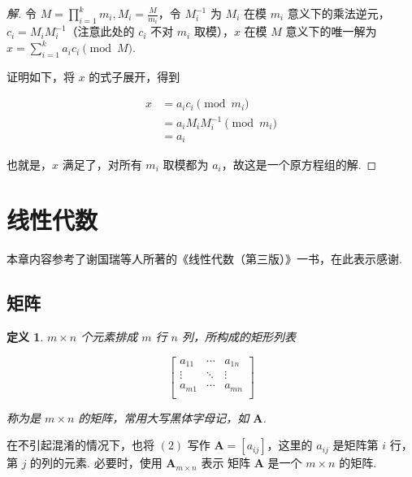 \documentclass[a4paper]{article}
\newtheorem{definition}{定义}[section]
\begin{document}
\begin{proof}[解]
    令 $M=\prod\limits_{i=1}^k m_i,M_i=\frac{M}{m_i}$，令 $M_i^{-1}$ 为
    $M_i$ 在模 $m_i$ 意义下的乘法逆元，$c_i=M_iM_i^{-1}$（注意此处的 $c_i$ 不对 $m_i$
    取模），$x$ 在模 $M$ 意义下的唯一解为 $x=\sum\limits_{i=1}^k a_ic_i\pmod M$.

    证明如下，将 $x$ 的式子展开，得到

    \begin{equation*}
        \begin{split}
            x&=a_ic_i\pmod {m_i}\\
            &=a_iM_iM_i^{-1}\pmod {m_i}\\
            &=a_i
        \end{split}
    \end{equation*}

    也就是，$x$ 满足了，对所有 $m_i$ 取模都为 $a_i$，故这是一个原方程组的解.
\end{proof}

\newpage

\section{线性代数}

本章内容参考了谢国瑞等人所著的《线性代数（第三版）》一书，在此表示感谢.

\subsection{矩阵}

\begin{definition}
    $m\times n$ 个元素排成 $m$ 行 $n$ 列，所构成的矩形列表

    \begin{equation}
        \begin{bmatrix}
            a_{11} & \cdots & a_{1n} \\
            \vdots & \ddots & \vdots \\
            a_{m1} & \cdots & a_{mn} \\
        \end{bmatrix}
    \end{equation}

    称为是 $m\times n$ 的矩阵，常用大写黑体字母记，如 $\boldsymbol A$.
\end{definition}

在不引起混淆的情况下，也将 $(2)$ 写作 $\boldsymbol A=[a_{ij}]$，这里的 $a_{ij}$
是矩阵第 $i$ 行，第 $j$ 的列的元素. 必要时，使用 $\boldsymbol A_{m\times n}$ 表示
矩阵 $\boldsymbol A$ 是一个 $m\times n$ 的矩阵.
\end{document}
